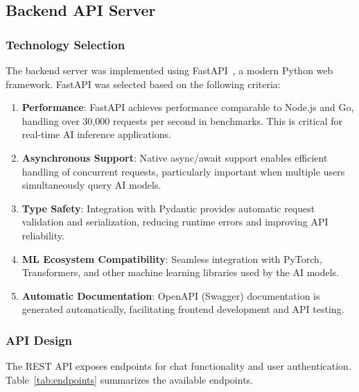 \subsection{Backend API Server}

\subsubsection{Technology Selection}

The backend server was implemented using FastAPI~\cite{fastapi}, a modern Python web framework. FastAPI was selected based on the following criteria:

\begin{enumerate}
    \item \textbf{Performance}: FastAPI achieves performance comparable to Node.js and Go, handling over 30,000 requests per second in benchmarks. This is critical for real-time AI inference applications.
    
    \item \textbf{Asynchronous Support}: Native async/await support enables efficient handling of concurrent requests, particularly important when multiple users simultaneously query AI models.
    
    \item \textbf{Type Safety}: Integration with Pydantic provides automatic request validation and serialization, reducing runtime errors and improving API reliability.
    
    \item \textbf{ML Ecosystem Compatibility}: Seamless integration with PyTorch, Transformers, and other machine learning libraries used by the AI models.
    
    \item \textbf{Automatic Documentation}: OpenAPI (Swagger) documentation is generated automatically, facilitating frontend development and API testing.
\end{enumerate}

\subsubsection{API Design}

The REST API exposes endpoints for chat functionality and user authentication. Table~\ref{tab:endpoints} summarizes the available endpoints.

